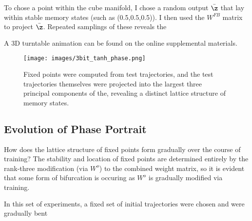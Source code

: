 \documentclass{article} %
\begin{document}
To chose a point within the cube manifold, I chose a random output $\bar{\z}$ that lay within stable memory states (such as (0.5,0.5,0.5)). I then used the $W^{FB}$ matrix to project $\bar{\z}$. Repeated samplings of these reveals the

A 3D turntable animation can be found on the online supplemental materials.

\begin{figure}
\centering
\texttt{[image: images/3bit\_tanh\_phase.png]}
\caption{Fixed points were computed from test trajectories, and the test trajectories themselves were projected into the largest three principal components of the, revealing a distinct lattice structure of memory states.}
\label{fig:3bit_phase}
\end{figure}

\subsection{Evolution of Phase Portrait}

How does the lattice structure of fixed points form gradually over the course of training? The stability and location of fixed points are determined entirely by the rank-three modification (via $W^o$) to the combined weight matrix, so it is evident that some form of bifurcation is occuring as $W^o$ is gradually modified via training.

In this set of experiments, a fixed set of initial trajectories were chosen and were gradually bent
\end{document}
